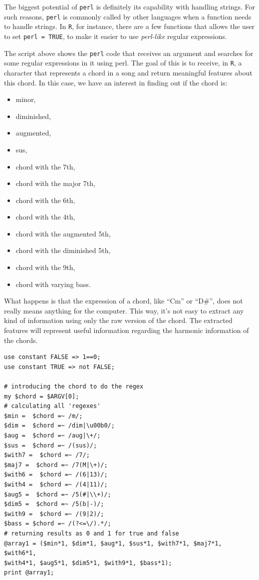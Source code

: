 \documentclass[]{article}
\providecommand{\tightlist}{%
  \setlength{\itemsep}{0pt}\setlength{\parskip}{0pt}}
\begin{document}
The biggest potential of \texttt{perl} is definitely its capability with
handling strings. For such reasons, \texttt{perl} is commonly called by
other languages when a function needs to handle strings. In \texttt{R},
for instance, there are a few functions that allows the user to set
\texttt{perl\ =\ TRUE}, to make it easier to use \emph{perl-like}
regular expressions.

The script above shows the \texttt{perl} code that receives an argument
and searches for some regular expressions in it using perl. The goal of
this is to receive, in \texttt{R}, a character that represents a chord
in a song and return meaningful features about this chord. In this case,
we have an interest in finding out if the chord is:

\begin{itemize}
\tightlist
\item
  minor,
\item
  diminished,
\item
  augmented,
\item
  sus,
\item
  chord with the 7th,
\item
  chord with the major 7th,
\item
  chord with the 6th,
\item
  chord with the 4th,
\item
  chord with the augmented 5th,
\item
  chord with the diminished 5th,
\item
  chord with the 9th,
\item
  chord with varying bass.
\end{itemize}

What happens is that the expression of a chord, like ``Cm'' or ``D\#'',
does not really means anything for the computer. This way, it's not easy
to extract any kind of information using only the raw version of the
chord. The extracted features will represent useful information
regarding the harmonic information of the chords.

\begin{verbatim}
use constant FALSE => 1==0;
use constant TRUE => not FALSE;

# introducing the chord to do the regex
my $chord = $ARGV[0];
# calculating all 'regexes'
$min =  $chord =~ /m/;
$dim =  $chord =~ /dim|\u00b0/;
$aug =  $chord =~ /aug|\+/;
$sus =  $chord =~ /(sus)/;
$with7 =  $chord =~ /7/;
$maj7 =  $chord =~ /7(M|\+)/;
$with6 =  $chord =~ /(6|13)/;
$with4 =  $chord =~ /(4|11)/;
$aug5 =  $chord =~ /5(#|\\+)/;
$dim5 =  $chord =~ /5(b|-)/;
$with9 =  $chord =~ /(9|2)/;
$bass = $chord =~ /(?<=\/).*/; 
# returning results as 0 and 1 for true and false
@array1 = ($min*1, $dim*1, $aug*1, $sus*1, $with7*1, $maj7*1, $with6*1,
$with4*1, $aug5*1, $dim5*1, $with9*1, $bass*1); 
print @array1;
\end{verbatim}
\end{document}
